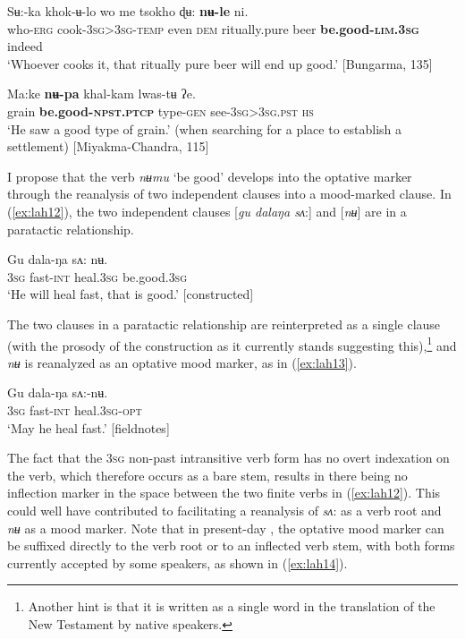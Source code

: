 \documentclass[output=paper,colorlinks,citecolor=brown]{langscibook}
\begin{document}
\ea\label{ex:lah10}
\gll Sʉ:-ka khok-ʉ-lo wo me tsokho ɖʉ: \textbf{nʉ-le} ni. \\
who-\textsc{erg} cook-\textsc{3sg>3sg-temp} even \textsc{dem} ritually.pure beer \textbf{be.good-\textsc{lim.3sg}} indeed \\
\glt `Whoever cooks it, that ritually pure beer will end up good.' [Bungarma, 135]
\z


\ea \label{ex:lah11}
\gll Ma:ke \textbf{nʉ-pa}  khal-kam lwas-tʉ ʔe. \\
grain \textbf{be.good-\textsc{npst.ptcp}} type-\textsc{gen} see-\textsc{3sg>3sg.pst} \textsc{hs} \\
\glt `He saw a good type of grain.' (when searching for a place to establish a settlement) [Miyakma-Chandra, 115]
\z

 I propose that the verb \textit{nʉmu} `be good' develops into the optative marker through the reanalysis of two independent clauses into a mood-marked clause. In (\ref{ex:lah12}), the two independent clauses [\textit{gu dalaŋa sʌ}:] and [\textit{nʉ}] are in a paratactic relationship. 

\ea \label{ex:lah12}
\gll Gu dala-ŋa sʌ: nʉ. \\
\textsc{3sg} fast-\textsc{int} heal\textsc{.3sg} be.good.\textsc{3sg} \\
\glt `He will heal fast, that is good.' [constructed]
\z

 The two clauses in a paratactic relationship are reinterpreted as a single clause (with the prosody of the construction as it currently stands suggesting this),\footnote{Another hint is that it is written as a single word in the translation of the New Testament by native  speakers.} and \textit{nʉ} is reanalyzed as an optative mood marker, as in (\ref{ex:lah13}).


\ea \label{ex:lah13}
\gll Gu dala-ŋa sʌ:-nʉ. \\
\textsc{3sg} fast\textsc{-int} heal.\textsc{3sg}-\textsc{opt} \\
\glt `May he heal fast.' [fieldnotes]
\z

 The fact that the \textsc{3sg} non-past intransitive verb form has no overt indexation on the verb, which therefore occurs as a bare stem, results in there being no inflection marker in the space between the two finite verbs in (\ref{ex:lah12}). This could well have contributed to facilitating a reanalysis of \textit{sʌ}: as a verb root and \textit{nʉ} as a mood marker. Note that in present-day , the optative mood marker can be suffixed directly to the verb root or to an inflected verb stem, with both forms currently accepted by some speakers, as shown in (\ref{ex:lah14}). 
\end{document}
